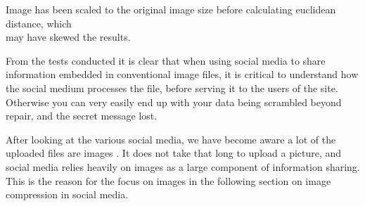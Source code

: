 \begin{table}[]
\begin{tabular}{@{}lllllll@{}}
	\end{tabular}
	\begin{tablenotes}
		\footnotesize{\item \textdagger Image has been scaled to the original image size before calculating euclidean distance, which\\ may have skewed the results.}
	\end{tablenotes}
\end{table}
\vspace{12pt}

From the tests conducted it is clear that when using social media to share information embedded in conventional image files, it is critical to understand how the social medium processes the file, before serving it to the users of the site.
Otherwise you can very easily end up with your data being scrambled beyond repair, and the secret message lost.\vspace*{12pt}

\noindent After looking at the various social media, we have become aware a lot of the uploaded files are images \citep{meeker2014internet}.
It does not take that long to upload a picture, and social media relies heavily on images as a large component of information sharing.
This is the reason for the focus on images in the following section on image compression in social media.
